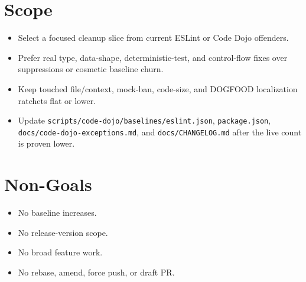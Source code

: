 \section{Scope}\label{record-236-scope}

\begin{itemize}
\tightlist
\item
  Select a focused cleanup slice from current ESLint or Code Dojo offenders.
\item
  Prefer real type, data-shape, deterministic-test, and control-flow fixes over suppressions or cosmetic baseline churn.
\item
  Keep touched file/context, mock-ban, code-size, and DOGFOOD localization ratchets flat or lower.
\item
  Update \texttt{s\allowbreak{}c\allowbreak{}r\allowbreak{}i\allowbreak{}p\allowbreak{}t\allowbreak{}s\allowbreak{}/\allowbreak{}c\allowbreak{}o\allowbreak{}d\allowbreak{}e\allowbreak{}-\allowbreak{}d\allowbreak{}o\allowbreak{}j\allowbreak{}o\allowbreak{}/\allowbreak{}b\allowbreak{}a\allowbreak{}s\allowbreak{}e\allowbreak{}l\allowbreak{}i\allowbreak{}n\allowbreak{}e\allowbreak{}s\allowbreak{}/\allowbreak{}e\allowbreak{}s\allowbreak{}l\allowbreak{}i\allowbreak{}n\allowbreak{}t\allowbreak{}.\allowbreak{}j\allowbreak{}s\allowbreak{}o\allowbreak{}n}, \texttt{p\allowbreak{}a\allowbreak{}c\allowbreak{}k\allowbreak{}a\allowbreak{}g\allowbreak{}e\allowbreak{}.\allowbreak{}j\allowbreak{}s\allowbreak{}o\allowbreak{}n}, \texttt{d\allowbreak{}o\allowbreak{}c\allowbreak{}s\allowbreak{}/\allowbreak{}c\allowbreak{}o\allowbreak{}d\allowbreak{}e\allowbreak{}-\allowbreak{}d\allowbreak{}o\allowbreak{}j\allowbreak{}o\allowbreak{}-\allowbreak{}e\allowbreak{}x\allowbreak{}c\allowbreak{}e\allowbreak{}p\allowbreak{}t\allowbreak{}i\allowbreak{}o\allowbreak{}n\allowbreak{}s\allowbreak{}.\allowbreak{}m\allowbreak{}d}, and \texttt{d\allowbreak{}o\allowbreak{}c\allowbreak{}s\allowbreak{}/\allowbreak{}C\allowbreak{}H\allowbreak{}A\allowbreak{}N\allowbreak{}G\allowbreak{}E\allowbreak{}L\allowbreak{}O\allowbreak{}G\allowbreak{}.\allowbreak{}m\allowbreak{}d} after the live count is proven lower.
\end{itemize}

\section{Non-Goals}\label{record-236-non-goals}

\begin{itemize}
\tightlist
\item
  No baseline increases.
\item
  No release-version scope.
\item
  No broad feature work.
\item
  No rebase, amend, force push, or draft PR.
\end{itemize}

